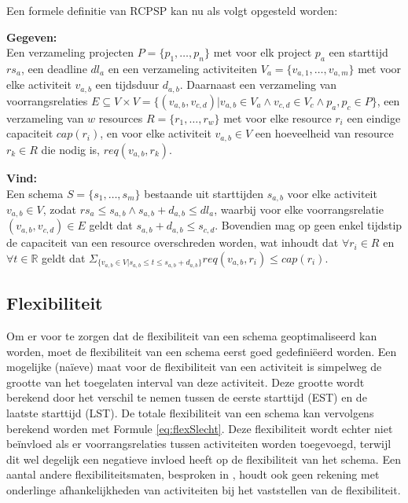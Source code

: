 Een formele definitie van RCPSP kan nu als volgt opgesteld worden:

\textbf{Gegeven:}\\
Een verzameling projecten $P = \{p_1, \dots ,p_n\}$ met voor elk project $p_a$ een starttijd $rs_a$, een deadline $dl_a$ en een verzameling activiteiten $V_a = \{v_{a,1},\dots ,v_{a,m}\}$ met voor elke activiteit $v_{a,b}$ een tijdsduur $d_{a,b}$. Daarnaast een verzameling van voorrangsrelaties $E \subseteq V \times V = \{(v_{a,b},v_{c,d}) | v_{a,b} \in V_a \wedge v_{c,d} \in V_c \wedge p_a,p_c \in P \}$, een verzameling van $w$ resources $R = \{r_1, \dots ,r_w\}$ met voor elke resource $r_i$ een eindige capaciteit $cap(r_i)$, en voor elke activiteit $v_{a,b} \in V$ een hoeveelheid van resource $r_k \in R$ die nodig is, $req(v_{a,b},r_k)$.

\textbf{Vind:}\\
Een schema $S = \{s_1,\dots ,s_m\}$ bestaande uit starttijden $s_{a,b}$ voor elke activiteit $v_{a,b} \in V$, zodat $rs_a \leq s_{a,b} \wedge s_{a,b} + d_{a,b} \leq dl_a$, waarbij voor elke voorrangsrelatie $(v_{a,b},v_{c,d}) \in E$ geldt dat $s_{a,b} + d_{a,b} \leq s_{c,d}$. Bovendien mag op geen enkel tijdstip de capaciteit van een resource overschreden worden, wat inhoudt dat $\forall r_i \in R$ en $\forall t \in \mathbb{R}$ geldt dat $\Sigma _{\{v_{a,b} \in V | s_{a,b} \leq t \leq s_{a,b} + d_{a,b}\}} req(v_{a,b},r_i) \leq cap(r_i)$.

\subsection{Flexibiliteit}
\label{subsec:flexprobleem}
Om er voor te zorgen dat de flexibiliteit van een schema geoptimaliseerd kan worden, moet de flexibiliteit van een schema eerst goed gedefini\"eerd worden. Een mogelijke (na\"ieve) maat voor de flexibiliteit van een activiteit is simpelweg de grootte van het toegelaten interval van deze activiteit. Deze grootte wordt berekend door het verschil te nemen tussen de eerste starttijd (EST) en de laatste starttijd (LST). De totale flexibiliteit van een schema kan vervolgens berekend worden met Formule \ref{eq:flexSlecht}. Deze flexibiliteit wordt echter niet be\"invloed als er voorrangsrelaties tussen activiteiten worden toegevoegd, terwijl dit wel degelijk een negatieve invloed heeft op de flexibiliteit van het schema. Een aantal andere flexibiliteitsmaten, besproken in \cite{wilson2013flexibility}, houdt ook geen rekening met onderlinge afhankelijkheden van activiteiten bij het vaststellen van de flexibiliteit.

